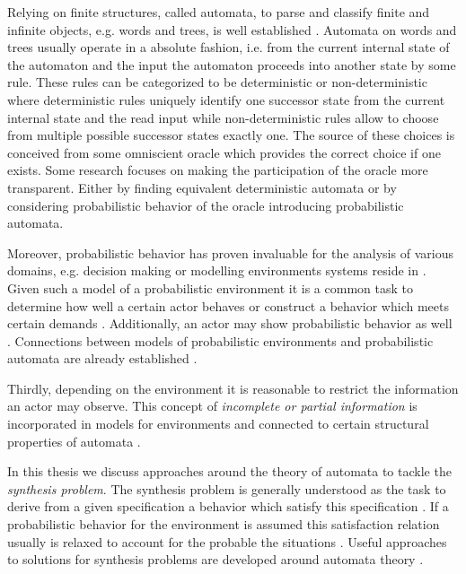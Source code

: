 Relying on finite structures, called automata, to parse and classify finite and
infinite objects, e.g. words and trees, is well established \cite{LangAutoLog,%
AutoInfObj}. Automata on words and trees usually operate in a absolute fashion,
i.e. from the current internal state of the automaton and the input the
automaton proceeds into another state by some rule. These rules can be
categorized to be deterministic or non-deterministic where deterministic rules
uniquely identify one successor state from the current internal state and the
read input while non-deterministic rules allow to choose from multiple possible
successor states exactly one. The source of these choices is conceived from
some omniscient oracle which provides the correct choice if one exists. Some
research focuses on making the participation of the oracle more transparent.
Either by finding equivalent deterministic automata
\cite{NonDetBuechiToDetParity} or by considering probabilistic behavior of the
oracle \cite{RandAutoInfTrees,RecOmeLangProbAuto} introducing probabilistic
automata.

Moreover, probabilistic behavior has proven invaluable for the analysis of
various domains, e.g. decision making \cite{ActingOptimallyInPOSD} or modelling
environments systems reside in \cite{PrinciplesOfMC}. Given such a model of a
probabilistic environment it is a common task to determine how well a certain
actor behaves \cite{PrinciplesOfMC} or construct a behavior which meets certain
demands \cite{SynProbEnv,QuanStochParityGames}. Additionally, an actor may show
probabilistic behavior as well \cite{RandomnessForFree}. Connections between
models of probabilistic environments and probabilistic automata are already
established \cite{DecProblemsForProbAuto}.

Thirdly, depending on the environment it is reasonable to restrict the
information an actor may observe. This concept of \emph{incomplete or partial
information} is incorporated in models for environments \cite{QualAnaPOMDP} and
connected to certain structural properties of automata 
\cite{ChurchsProblemRevisited}.

In this thesis we discuss approaches around the theory of automata to tackle
the \emph{synthesis problem}. The synthesis problem is generally understood as
the task to derive from a given specification a behavior which satisfy this
specification \cite{Church}. If a probabilistic behavior for the environment is
assumed this satisfaction relation usually is relaxed to account for the
probable the situations \cite{SynProbEnv,PrincinplesOfMC,QualAnaPOMDP}. Useful
approaches to solutions for synthesis problems are developed around automata
theory \cite{ChurchsProblemRevisited,SynProbEnv,AutoInfObj}.
